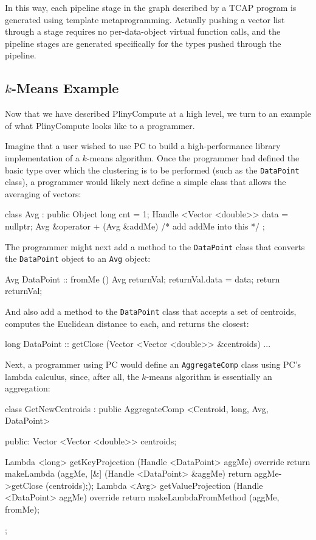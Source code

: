 In this way, each pipeline stage in the graph described by a TCAP program is generated using template metaprogramming.
Actually pushing a vector list through a stage requires no per-data-object virtual function calls, and the pipeline stages
are generated specifically for the types pushed through the pipeline.

\subsection{$k$-Means Example}

Now that we have described PlinyCompute at a high level, we turn to an example of what PlinyCompute looks like to a programmer.

Imagine that a user wished to use PC to build a high-performance library implementation of a $k$-means algorithm.
Once the programmer had defined the basic type over which the clustering is to be performed (such as the
\texttt{DataPoint} class), 
a programmer would likely next define a simple class that allows the averaging of vectors:

\begin{code}
class Avg : public Object {
	long cnt = 1;
	Handle <Vector <double>> data = nullptr;
	Avg &operator + (Avg &addMe) {/* add addMe into this */}
};
\end{code}

\noindent
The programmer might next add a method to the \texttt{DataPoint} class that converts the \texttt{DataPoint} object to an \texttt{Avg} object:

\begin{code}
Avg DataPoint :: fromMe () {
	Avg returnVal;
	returnVal.data = data;
	return returnVal;
}
\end{code}

\noindent
And also add a method to the \texttt{DataPoint} class that accepts a set of centroids, computes the Euclidean distance to
each, and returns the closest:

\begin{code}
long DataPoint :: getClose (Vector <Vector <double>> &centroids) {...}
\end{code}

\noindent
Next, a programmer using PC would define an \texttt{AggregateComp} class using PC's lambda calculus, since, after all, the $k$-means algorithm is essentially 
an aggregation:

\begin{code}
class GetNewCentroids : public AggregateComp <Centroid, long, Avg, DataPoint> {

public:
   Vector <Vector <double>> centroids;

   Lambda <long> getKeyProjection (Handle <DataPoint> aggMe) override {
      return makeLambda (aggMe, [&] (Handle <DataPoint> &aggMe) 
         {return aggMe->getClose (centroids);});
   }
   Lambda <Avg> getValueProjection (Handle <DataPoint> aggMe) override {
      return makeLambdaFromMethod (aggMe, fromMe);
   }
};
\end{code}

